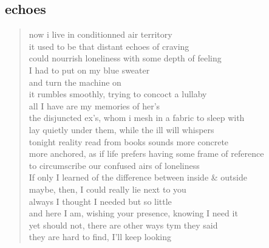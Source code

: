 \documentclass[11pt]{article}
\begin{document}
\subsection{echoes}
\label{sec:orgff7426f}
\begin{verse}
now i live in conditionned air territory\\
it used to be that distant echoes of craving\\
could nourrish loneliness with some depth of feeling\\
I had to put on my blue sweater\\
and turn the machine on\\
\vspace*{1em}
it rumbles smoothly, trying to concoct a lullaby\\
all I have are my memories of her's\\
the disjuncted ex's, whom i mesh in a fabric to sleep with\\
lay quietly under them, while the ill will whispers\\
tonight reality read from books sounds more concrete\\
more anchored, as if life prefers having some frame of reference\\
to circumscribe our confused airs of loneliness\\
\vspace*{1em}
If only I learned of the difference between inside \& outside\\
maybe, then, I could really lie next to you\\
always I thought I needed but so little\\
and here I am, wishing your presence, knowing I need it\\
yet should not, there are other ways tym they said\\
they are hard to find, I'll keep looking\\
\end{verse}
\end{document}
